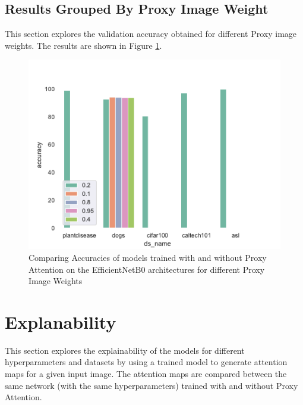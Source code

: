 \subsection{Results Grouped By Proxy Image Weight}
This section explores the validation accuracy obtained for different Proxy image weights. The results are shown in Figure \ref{fig:proxy_weight}. 
\begin{figure}[H]
    \centering
    \includegraphics[width=1\textwidth]{results/proxy_weight_results.pdf}
    \caption{Comparing Accuracies of models trained with and without Proxy Attention on the EfficientNetB0 \cite{tanEfficientnetRethinkingModel2019} architectures for different Proxy Image Weights}
    \label{fig:proxy_weight}
\end{figure}



\section{Explanability}
This section explores the explainability of the models for different hyperparameters and datasets by using a trained model to generate attention maps for a given input image. The attention maps are compared between the same network (with the same hyperparameters) trained with and without Proxy Attention.

